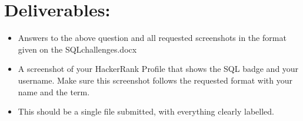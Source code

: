 \documentclass[12pt]{article}
\begin{document}
\section*{Deliverables:}
\begin{itemize}
    \item Answers to the above question and all requested screenshots in the format given on the SQLchallenges.docx
    \item A screenshot of your HackerRank Profile that shows the SQL badge and your username.  Make sure this screenshot follows the requested format with your name and the term.
    \item This should be a single file submitted, with everything clearly labelled.
\end{itemize} 
\end{document}
